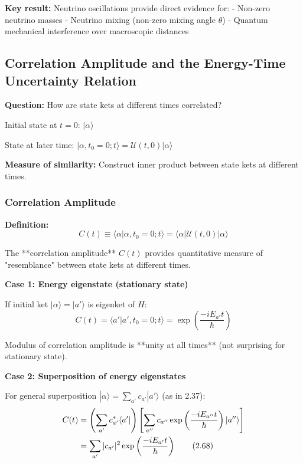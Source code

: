 \documentclass[11pt,a4paper]{article}
\begin{document}
\textbf{Key result:} Neutrino oscillations provide direct evidence for:
- Non-zero neutrino masses
- Neutrino mixing (non-zero mixing angle $\theta$)
- Quantum mechanical interference over macroscopic distances

\subsection{Correlation Amplitude and the Energy-Time Uncertainty Relation}

\textbf{Question:} How are state kets at different times correlated?

Initial state at $t = 0$: $|\alpha\rangle$

State at later time: $|\alpha, t_0 = 0; t\rangle = \mathscr{U}(t, 0)|\alpha\rangle$

\textbf{Measure of similarity:} Construct inner product between state kets at different times.

\subsubsection{Correlation Amplitude}

\textbf{Definition:}
\begin{equation}
C(t) \equiv \langle\alpha|\alpha, t_0 = 0; t\rangle = \langle\alpha|\mathscr{U}(t, 0)|\alpha\rangle
\tag{2.66}
\end{equation}

The **correlation amplitude** $C(t)$ provides quantitative measure of "resemblance" between state kets at different times.

\textbf{Case 1: Energy eigenstate (stationary state)}

If initial ket $|\alpha\rangle = |a'\rangle$ is eigenket of $H$:
\begin{equation}
C(t) = \langle a'|a', t_0 = 0; t\rangle = \exp\left(\frac{-iE_{a'}t}{\hbar}\right)
\tag{2.67}
\end{equation}

Modulus of correlation amplitude is **unity at all times** (not surprising for stationary state).

\textbf{Case 2: Superposition of energy eigenstates}

For general superposition $|\alpha\rangle = \sum_{a'}c_{a'}|a'\rangle$ (as in 2.37):
\begin{align}
C(t) &= \left(\sum_{a'}c_{a'}^*\langle a'|\right)\left[\sum_{a''}c_{a''}\exp\left(\frac{-iE_{a''}t}{\hbar}\right)|a''\rangle\right] \notag \\
&= \sum_{a'}|c_{a'}|^2\exp\left(\frac{-iE_{a'}t}{\hbar}\right)
\tag{2.68}
\end{align}
\end{document}
